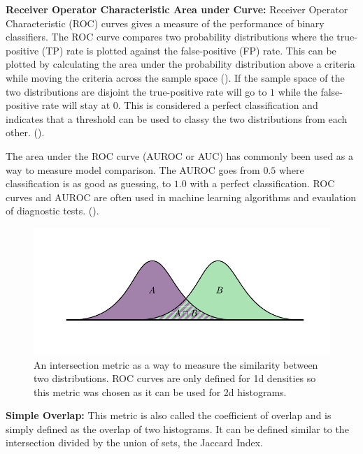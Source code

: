 \documentclass[altfont, fleqn]{uiophd}
\renewcommand{\cref}[1]{{\color{viridis_03}\mycref{#1}}}
\begin{document}
\noindent
{\bf Receiver Operator Characteristic Area under Curve:}
Receiver Operator Characteristic (ROC) curves gives a measure of the performance of
binary classifiers. 
The ROC curve compares two probability distributions where
the true-positive (TP) 
rate is plotted against the false-positive (FP) rate. 
This can be plotted by calculating the area under the probability 
distribution above a criteria while moving the criteria across 
the sample space 
(\cref{fig:3_roc_auc}). 
If the sample space of the two distributions are disjoint
the true-positive rate will go to $1$ while
the false-positive rate will stay at $0$. 
This is considered a perfect classification and indicates
that a threshold can be used to classy the two distributions from each other. 
(\textcite{_receiver_2016}).

The area under the ROC curve (AUROC or AUC) has commonly been used
as a way to measure model comparison. 
The AUROC goes from $0.5$ where classification
is as good as guessing, 
to $1.0$ with a perfect classification.
ROC curves and AUROC are often used in 
machine learning algorithms and evaulation of diagnostic tests. 
(\textcite{bradley_use_1997, park_receiver_2004, _receiver_2016}).
\newline 

\begin{figure}[h]
    \begin{center}
        \includegraphics[width=1\textwidth]{images/sec_3/hist_inter.pdf}
        \caption{
            An intersection metric as a way to measure the similarity
            between two distributions.
            ROC curves are only defined for 1d densities so this
            metric was chosen as it can be used for 2d histograms. 
        }
        \label{fig:3_hist_inter}
    \end{center}
\end{figure}

\noindent
{\bf Simple Overlap:}
This metric is also called the coefficient of overlap
and 
is simply defined as the overlap
of two histograms. 
It can be defined similar to the intersection divided by the union of sets, 
the Jaccard Index. 
\end{document}
